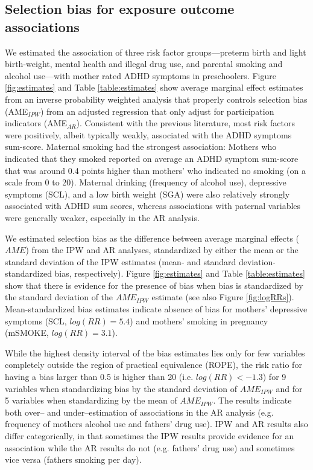 \documentclass[]{article}
\begin{document}
\subsection*{Selection bias for exposure outcome associations}
We estimated the association of three risk factor groups---preterm birth and light birth-weight, mental health and illegal drug use, and parental smoking and alcohol use---with mother rated ADHD symptoms in preschoolers. Figure \ref{fig:estimates} and Table \ref{table:estimates} show average marginal effect estimates from an inverse probability weighted analysis that properly controls selection bias (AME$_{IPW}$) from an adjusted regression that only adjust for participation indicators (AME$_{AR}$). Consistent with the previous literature, most risk factors were positively, albeit typically weakly, associated with the ADHD symptoms sum-score. Maternal smoking had the strongest association: Mothers who indicated that they smoked reported on average an ADHD symptom sum-score that was around 0.4 points higher than mothers' who indicated no smoking (on a scale from 0 to 20). Maternal drinking (frequency of alcohol use), depressive symptoms (SCL), and a low birth weight (SGA) were also relatively strongly associated with ADHD sum scores, whereas associations with paternal variables were generally weaker, especially in the AR analysis.


We estimated selection bias as the difference between average marginal effects ($AME$) from the IPW and AR analyses, standardized by either the mean or the standard deviation of the IPW estimates (mean- and standard deviation-standardized bias, respectively). Figure \ref{fig:estimates} and Table \ref{table:estimates} show that there is evidence for the presence of bias when bias is standardized by the standard deviation of the $AME_{IPW}$ estimate (see also Figure \ref{fig:logRRs}). Mean-standardized bias estimates indicate absence of bias for mothers' depressive symptoms (SCL, $log(RR)=5.4$) and mothers' smoking in pregnancy (mSMOKE, $log(RR)=3.1$). 

While the highest density interval of the bias estimates lies only for few variables completely outside the region of practical equivalence (ROPE), the risk ratio for having a bias larger than 0.5 is higher than 20 (i.e. $log(RR) < -1.3$) for 9 variables when standardizing bias by the standard deviation of $AME_{IPW}$ and for 5 variables when standardizing by the mean of $AME_{IPW}$. The results indicate both over-- and under--estimation of associations in the AR analysis (e.g. frequency of mothers alcohol use and fathers' drug use).  IPW and AR results also differ categorically, in that sometimes the IPW results provide evidence for an association while the AR results do not (e.g. fathers' drug use) and sometimes vice versa (fathers smoking per day). 
\end{document}
